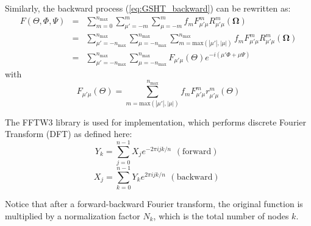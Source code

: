 Similarly, the backward process (\ref{eq:GSHT_backward}) can be rewritten
as:
\begin{eqnarray}
F(\Theta,\Phi,\Psi) & = & \sum_{m=0}^{n_{\mathrm{max}}}\sum_{\mu'=-m}^{m}\sum_{\mu=-m}^{m}f_{m}F_{\mu'\mu}^{m}R_{\mu'\mu}^{m}(\mathbf{\Omega})\nonumber \\
 & = & \sum_{\mu'=-n_{\mathrm{max}}}^{n_{\mathrm{max}}}\sum_{\mu=-n_{\mathrm{max}}}^{n_{\mathrm{max}}}\sum_{m=\mathrm{max}\left(\left|\mu'\right|,\left|\mu\right|\right)}^{n_{\mathrm{max}}}f_{m}F_{\mu'\mu}^{m}R_{\mu'\mu}^{m}(\mathbf{\Omega})\nonumber \\
 & = & \sum_{\mu'=-n_{\mathrm{max}}}^{n_{\mathrm{max}}}\sum_{\mu=-n_{\mathrm{max}}}^{n_{\mathrm{max}}}F_{\mu'\mu}(\Theta)e^{-i(\mu'\Phi+\mu\Psi)}\label{eq:f_mup_mu_2}
\end{eqnarray}
with
\begin{equation}
F_{\mu'\mu}(\Theta)=\sum_{m=\mathrm{max}\left(\left|\mu'\right|,\left|\mu\right|\right)}^{n_{\mathrm{max}}}f_{m}F_{\mu'\mu}^{m}r_{\mu'\mu}^{m}(\Theta)\label{eq:f_mup_mu_3}
\end{equation}


The FFTW3 library \citep{FFTW3} is used for implementation, which
performs discrete Fourier Transform (DFT) as defined here:
\begin{equation}
Y_{k}=\sum_{j=0}^{n-1}X_{j}e^{-2\pi ijk/n}\begin{array}{c}
\mathrm{(forward)}\end{array}\label{eq:fftw3-fwd}
\end{equation}
\begin{equation}
X_{j}=\sum_{k=0}^{n-1}Y_{k}e^{2\pi ijk/n}\begin{array}{c}
\mathrm{(backward)}\end{array}\label{eq:fftw3-bwd}
\end{equation}


Notice that after a forward-backward Fourier transform,
the original function is multiplied by a normalization factor $N_{k}$,
which is the total number of nodes $k$.

